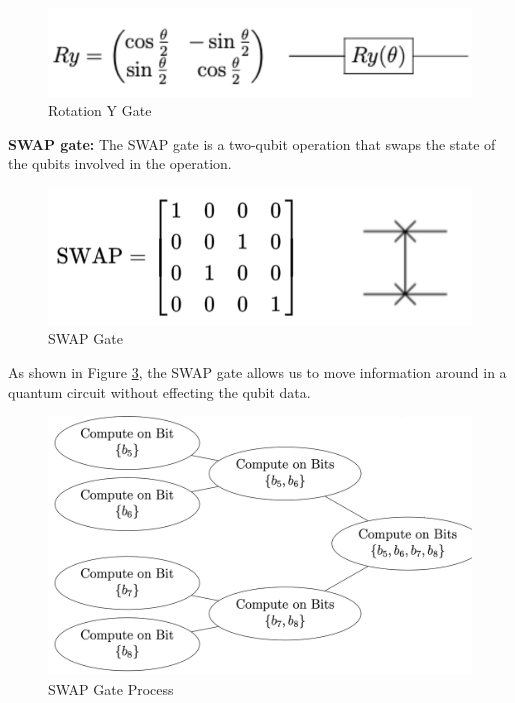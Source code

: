 \begin{figure}[h!]
      \centering
      \includegraphics[scale=0.7]{background/RGate.png}
      \caption{Rotation Y Gate
      \citep{Khan2019}}
      \label{RYGa}
\end{figure}


\textbf{SWAP  gate:} The SWAP gate is a two-qubit operation that swaps the state of the qubits involved in the operation.
\begin{figure}[h!]
      \centering
      \includegraphics[scale=0.6]{background/SWAPG.png}
      \caption{SWAP Gate}
      \label{SWAPLogic}
\end{figure}


As shown in Figure \ref{SWAPGa}, the SWAP gate allows us to move information around in a quantum circuit without effecting the qubit data. %

\begin{figure}[H]

       \centering
      \includegraphics[scale=0.2]{background/SWAP.png}
      \caption{SWAP Gate Process
      \citep{Cortese}}
      \label{SWAPGa}
\end{figure}




